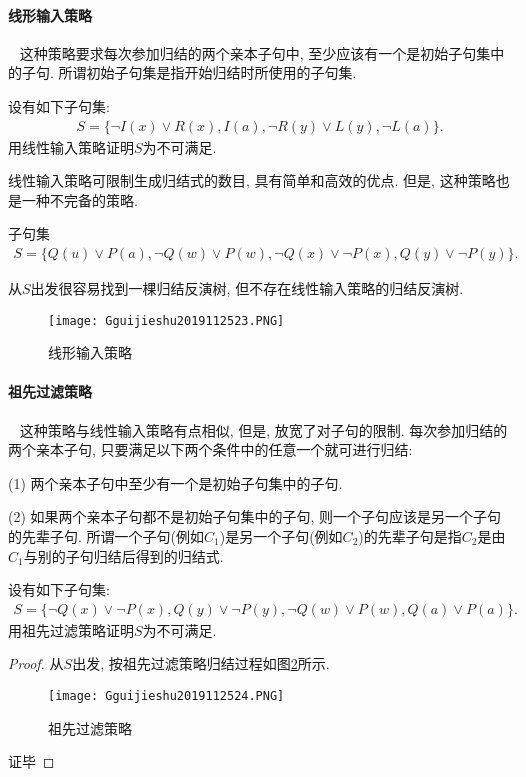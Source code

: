 \paragraph{线形输入策略}~{}
这种策略要求每次参加归结的两个亲本子句中, 至少应该有一个是初始子句集中的子句. 所谓初始子句集是指开始归结时所使用的子句集.
\begin{example}
设有如下子句集:
\begin{align}
  S=\{\neg I(x)\vee R(x), I(a), \neg R(y)\vee L(y), \neg L(a)\}.
\end{align}
用线性输入策略证明$S$为不可满足.
\end{example}

线性输入策略可限制生成归结式的数目, 具有简单和高效的优点. 但是, 这种策略也是一种不完备的策略.
\begin{example}
子句集
\begin{align}
  S=\{Q(u)\vee P(a), \neg Q(w)\vee P(w), \neg Q(x)\vee \neg  P(x), Q(y)\vee \neg  P(y)\}.
\end{align}
\end{example}
从$S$出发很容易找到一棵归结反演树, 但不存在线性输入策略的归结反演树.
\begin{figure}[H]
\centering
\texttt{[image: Gguijieshu2019112523.PNG]}
\caption{线形输入策略}
\label{AI32fig23}
\end{figure}
\paragraph{祖先过滤策略}~{}
这种策略与线性输入策略有点相似, 但是, 放宽了对子句的限制. 每次参加归结的两个亲本子句, 只要满足以下两个条件中的任意一个就可进行归结:

(1) 两个亲本子句中至少有一个是初始子句集中的子句.

(2) 如果两个亲本子句都不是初始子句集中的子句, 则一个子句应该是另一个子句的先辈子句. 所谓一个子句(例如$C_1$)是另一个子句(例如$C_2$)的先辈子句是指$C_2$是由$C_1$与别的子句归结后得到的归结式.
\begin{example}
设有如下子句集:
\begin{align}
  S=\{\neg Q(x)\vee \neg P(x),  Q(y)\vee \neg P(y), \neg Q(w)\vee P(w) ,  Q(a)\vee P(a)\}.
\end{align}
用祖先过滤策略证明$S$为不可满足.
\end{example}
\begin{proof}
从$S$出发, 按祖先过滤策略归结过程如图\ref{AI32fig24}所示.
\begin{figure}[H]
\centering
\texttt{[image: Gguijieshu2019112524.PNG]}
\caption{祖先过滤策略}
\label{AI32fig24}
\end{figure}
证毕
\end{proof}

